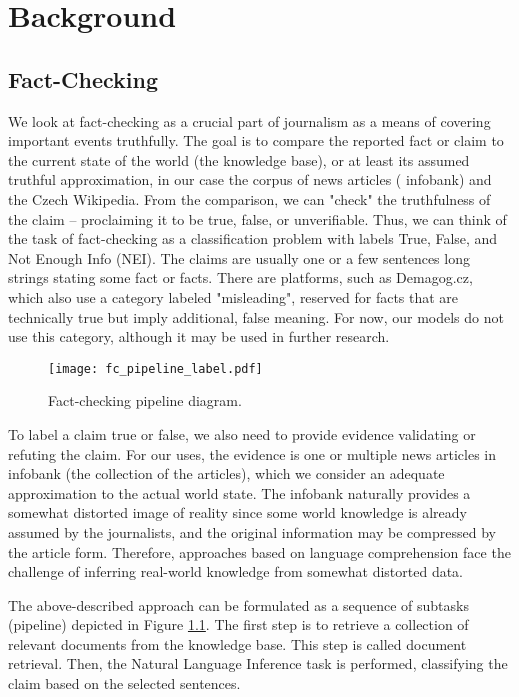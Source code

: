 \chapter{Background}

\section{Fact-Checking}

We look at fact-checking as a crucial part of journalism as a means of covering important events truthfully. 
The goal is to compare the reported fact or claim to the current state of the world (the knowledge base), or at least its assumed truthful approximation, in our case the corpus of \CTK{} news articles (\CTK{} infobank) and the Czech Wikipedia.
From the comparison, we can "check" the truthfulness of the claim -- proclaiming it to be true, false, or unverifiable. 
Thus, we can think of the task of fact-checking as a classification problem with labels True, False, and Not Enough Info (NEI). 
The claims are usually one or a few sentences long strings stating some fact or facts. 
There are platforms, such as Demagog.cz, which also use a category labeled "misleading", reserved for facts that are technically true but imply additional, false meaning.
For now, our models do not use this category, although it may be used in further research.

\begin{figure}[h!]
    \centering
    \texttt{[image: fc\_pipeline\_label.pdf]}
    \caption{Fact-checking pipeline diagram.}
    \label{fig:pipeline}
\end{figure}

To label a claim true or false, we also need to provide evidence validating or refuting the claim.
For our uses, the evidence is one or multiple news articles in \CTK{} infobank (the collection of the articles), which we consider an adequate approximation to the actual world state.
The infobank naturally provides a somewhat distorted image of reality since some world knowledge is already assumed by the journalists, and the original information may be compressed by the article form. 
Therefore, approaches based on language comprehension face the challenge of inferring real-world knowledge from somewhat distorted data. 

The above-described approach can be formulated as a sequence of subtasks (pipeline) depicted in Figure \ref{fig:pipeline}. The first step is to retrieve a collection of relevant documents from the knowledge base. This step is called document retrieval. Then, the Natural Language Inference task is performed, classifying the claim based on the selected sentences.

